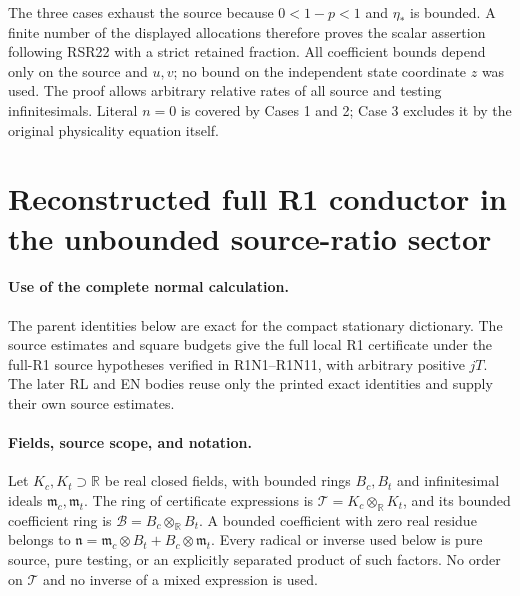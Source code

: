 The three cases exhaust the source because $0<1-p<1$ and $\eta_*$
is bounded. A finite number of the displayed allocations therefore
proves the scalar assertion following RSR22 with a strict retained
fraction. All coefficient bounds depend only on the source and
$u,v$; no bound on the independent state coordinate $z$ was used.
The proof allows arbitrary relative rates of all source and testing
infinitesimals. Literal $n=0$ is covered by Cases 1 and 2; Case 3
excludes it by the original physicality equation itself.



\section{\texorpdfstring{Reconstructed full R1 conductor in the unbounded source-ratio sector}{Reconstructed full R1 conductor in the unbounded source-ratio sector}}
\label{component:p261f71af685d}

\label{p261f71af685d:sec:fn-reconstructed}

\paragraph{Use of the complete normal calculation.}
The parent identities below are exact for the compact stationary dictionary.
The source estimates and square budgets give the full local R1 certificate
under the full-R1 source hypotheses verified in R1N1--R1N11, with arbitrary
positive $jT$. The later RL and EN bodies reuse only the printed exact
identities and supply their own source estimates.

\paragraph{Fields, source scope, and notation.}
Let $K_c,K_t\supset\mathbb R$ be real closed fields, with bounded rings
$B_c,B_t$ and infinitesimal ideals $\mathfrak m_c,\mathfrak m_t$.
The ring of certificate expressions is
$\mathcal T=K_c\otimes_{\mathbb R}K_t$, and its bounded coefficient ring
is $\mathcal B=B_c\otimes_{\mathbb R}B_t$.  A bounded coefficient with
zero real residue belongs to
$\mathfrak n=\mathfrak m_c\otimes B_t+B_c\otimes\mathfrak m_t$.
Every radical or inverse used below is pure source, pure testing, or
an explicitly separated product of such factors.  No order on
$\mathcal T$ and no inverse of a mixed expression is used.


